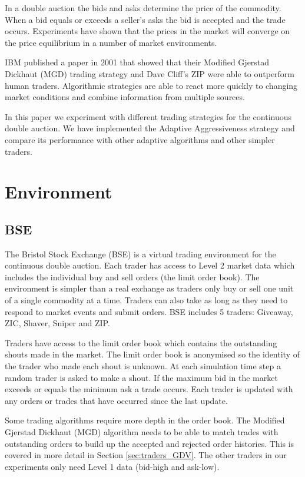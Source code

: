 \documentclass[preprint]{acm_proc_article-sp} %
\begin{document}
In a double auction the bids and asks determine the price of the commodity.
When a bid equals or exceeds a seller's asks the bid is accepted and the trade
occurs. Experiments have shown  that the prices in the market will
 converge on the price equilibrium in a number of market
environments\cite{smith_1962}.

IBM published a paper in 2001 that showed that their Modified Gjerstad Dickhaut (MGD) trading strategy and
Dave Cliff's ZIP were able to outperform human traders\cite{ibm_human}.
Algorithmic strategies are able to react more quickly to changing market
conditions and combine information from multiple sources.

In this paper we experiment with different trading strategies for the
continuous double auction.
We have implemented the Adaptive Aggressiveness\cite{AA_thesis} strategy and compare its performance with other adaptive algorithms and other simpler traders.\\


\section{Environment} \label{sec:environment}
\subsection{BSE} \label{sec:BSE}
The Bristol Stock Exchange (BSE) is a virtual trading environment for the
continuous double auction. Each trader has access to Level 2 market data which
includes the individual buy and sell orders (the limit order book). The
environment is simpler than a real exchange as traders only buy or sell one
unit of a single commodity at a time. Traders can also take as long as they
need to respond to market events and submit orders. BSE includes 5 traders: Giveaway, ZIC, Shaver, Sniper and ZIP.

Traders have access to the limit order book which contains the outstanding
shouts made in the market. The limit order book is anonymised so the identity
of the trader who made each shout is unknown. At each simulation time step a
random trader is asked to make a shout. If the maximum bid in the market
exceeds or equals the minimum ask a trade occurs. Each trader is updated with
any orders or trades that have occurred since the last update.

Some trading algorithms require more depth in the order book. The Modified
Gjerstad Dickhaut (MGD) algorithm needs to be able to match trades with
outstanding orders to build up the accepted and rejected order histories.
This is covered in more detail in Section \ref{sec:traders_GDV}. The
other traders in our experiments only need Level 1 data
(bid-high and ask-low).
\end{document}
